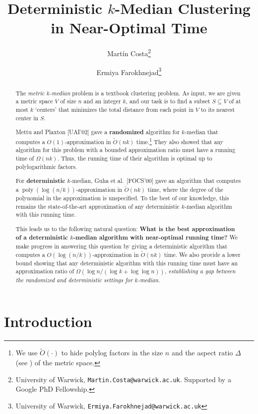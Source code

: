 \documentclass[11pt]{article}
\title{Deterministic $k$-Median Clustering in Near-Optimal Time}
\author{Mart\'{i}n Costa\thanks{University of Warwick, \texttt{Martin.Costa@warwick.ac.uk}. Supported by a Google PhD Fellowship.}
\and Ermiya Farokhnejad\thanks{University of Warwick, \texttt{Ermiya.Farokhnejad@warwick.ac.uk}}}
\date{}
\newcommand{\1}{\mathmybb{1}}
\DeclareMathOperator*{\poly}{poly}
\begin{document}
\maketitle

\begin{abstract}
    The \emph{metric $k$-median} problem is a textbook clustering problem. As input, we are given a metric space $V$ of size $n$ and an integer $k$, and our task is to find a subset $S \subseteq V$ of at most $k$ `centers' that minimizes the total distance from each point in $V$ to its nearest center in $S$.

    Mettu and Plaxton [UAI'02] gave a \textbf{randomized} algorithm for $k$-median that computes a $O(1)$-approximation in $\tilde O(nk)$ time.\footnote{We use $\tilde O(\cdot)$ to hide polylog factors in the size $n$ and the aspect ratio $\Delta$ (see ) of the metric space.} They also showed that any algorithm for this problem with a bounded approximation ratio must have a running time of $\Omega(nk)$. Thus, the running time of their algorithm is optimal up to polylogarithmic factors.

    For \textbf{deterministic} $k$-median, Guha et al.~[FOCS'00] gave an algorithm that computes a 
    $\poly(\log (n/k))$-approximation in $\tilde O(nk)$ time, where the degree of the polynomial in the approximation is unspecified. To the best of our knowledge, this remains the state-of-the-art approximation of any deterministic $k$-median algorithm with this running time. 
    
    This leads us to the following natural question: \textbf{What is the best approximation of a deterministic $k$-median algorithm with near-optimal running time?} We make progress in answering this question by giving a deterministic algorithm that computes a $O(\log(n/k))$-approximation in $\tilde O(nk)$ time. We also provide a lower bound showing that any deterministic algorithm with this running time must have an approximation ratio of $\Omega(\log n/(\log k + \log \log n))$, \emph{establishing a gap between the randomized and deterministic settings for $k$-median}.
\end{abstract}



\section{Introduction}\label{sec:intro}
\end{document}
